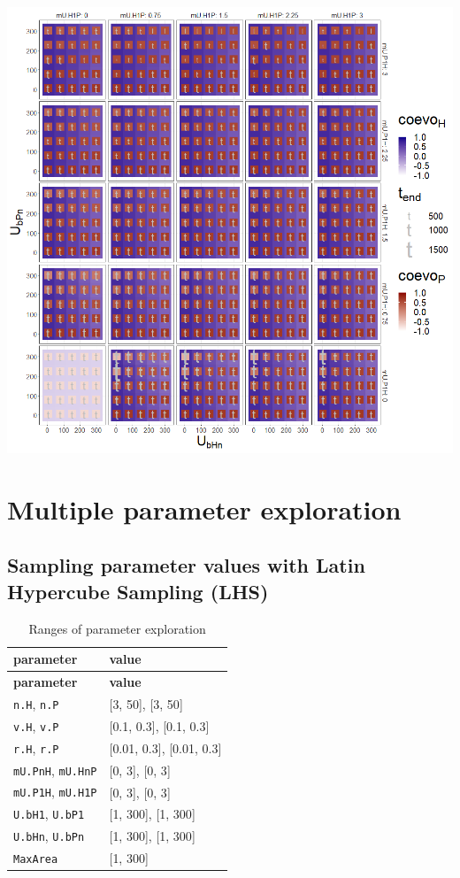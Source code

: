 \documentclass[
]{book}
\begin{document}
\newpage

\includegraphics[width=1\linewidth]{plots/4_fourPar-U.bn-mU1_plot}

\hypertarget{multiple-parameter-exploration}{%
\chapter{Multiple parameter exploration}\label{multiple-parameter-exploration}}

\newpage

\hypertarget{sampling-parameter-values-with-latin-hypercube-sampling-lhs}{%
\section{Sampling parameter values with Latin Hypercube Sampling (LHS)}\label{sampling-parameter-values-with-latin-hypercube-sampling-lhs}}

\begin{longtable}[]{@{}ll@{}}
\caption{Ranges of parameter exploration}\tabularnewline
\toprule
\textbf{parameter} & \textbf{value}\tabularnewline
\midrule
\endfirsthead
\toprule
\textbf{parameter} & \textbf{value}\tabularnewline
\midrule
\endhead
\texttt{n.H}, \texttt{n.P} & {[}3, 50{]}, {[}3, 50{]}\tabularnewline
\texttt{v.H}, \texttt{v.P} & {[}0.1, 0.3{]}, {[}0.1, 0.3{]}\tabularnewline
\texttt{r.H}, \texttt{r.P} & {[}0.01, 0.3{]}, {[}0.01, 0.3{]}\tabularnewline
\texttt{mU.PnH}, \texttt{mU.HnP} & {[}0, 3{]}, {[}0, 3{]}\tabularnewline
\texttt{mU.P1H}, \texttt{mU.H1P} & {[}0, 3{]}, {[}0, 3{]}\tabularnewline
\texttt{U.bH1}, \texttt{U.bP1} & {[}1, 300{]}, {[}1, 300{]}\tabularnewline
\texttt{U.bHn}, \texttt{U.bPn} & {[}1, 300{]}, {[}1, 300{]}\tabularnewline
\texttt{MaxArea} & {[}1, 300{]}\tabularnewline
\bottomrule
\end{longtable}
\end{document}
